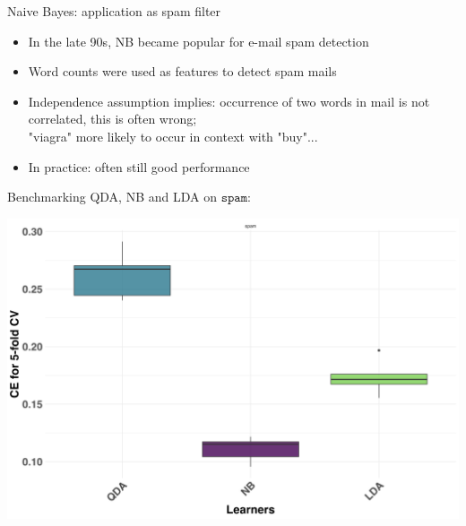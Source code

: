 \documentclass[11pt,compress,t,notes=noshow, xcolor=table]{beamer}
\begin{document}



\begin{vbframe}{Naive Bayes: application as spam filter}
\begin{itemize}
  \item In the late 90s, NB became popular for e-mail spam detection 
  \item Word counts were used as features to detect spam mails
  \item Independence assumption implies: occurrence of two words in mail is not correlated, this is often wrong; \\
  "viagra" more likely to occur in context with "buy"...
  \item In practice: often still good performance
\end{itemize}
\lz

Benchmarking QDA, NB and LDA on $\texttt{spam}$:
\lz

\begin{center}
\includegraphics[clip=true, trim={0 0 0 17}, width=0.4\linewidth]{figure/nb-bench.png}
\end{center}

\end{vbframe}

\endlecture
\end{document}

